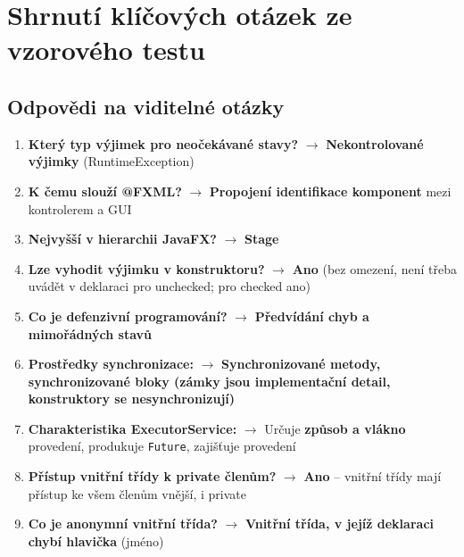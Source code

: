 \documentclass[11pt,a4paper]{article}
\begin{document}
\section{Shrnutí klíčových otázek ze vzorového testu}

\subsection{Odpovědi na viditelné otázky}

\begin{enumerate}[label=\textbf{Otázka \arabic*:}]
    \item \textbf{Který typ výjimek pro neočekávané stavy?} $\rightarrow$ \textbf{Nekontrolované výjimky} (RuntimeException)
    
    \item \textbf{K čemu slouží @FXML?} $\rightarrow$ \textbf{Propojení identifikace komponent} mezi kontrolerem a GUI
    
    \item \textbf{Nejvyšší v hierarchii JavaFX?} $\rightarrow$ \textbf{Stage}
    
    \item \textbf{Lze vyhodit výjimku v konstruktoru?} $\rightarrow$ \textbf{Ano} (bez omezení, není třeba uvádět v deklaraci pro unchecked; pro checked ano)
    
    \item \textbf{Co je defenzivní programování?} $\rightarrow$ \textbf{Předvídání chyb a mimořádných stavů}
    
    \item \textbf{Prostředky synchronizace:} $\rightarrow$ \textbf{Synchronizované metody, synchronizované bloky (zámky jsou implementační detail, konstruktory se nesynchronizují)}
    
    \item \textbf{Charakteristika ExecutorService:} $\rightarrow$ Určuje \textbf{způsob a vlákno} provedení, produkuje \texttt{Future}, zajišťuje provedení
    
    \item \textbf{Přístup vnitřní třídy k private členům?} $\rightarrow$ \textbf{Ano} -- vnitřní třídy mají přístup ke všem členům vnější, i private
    
    \item \textbf{Co je anonymní vnitřní třída?} $\rightarrow$ \textbf{Vnitřní třída, v jejíž deklaraci chybí hlavička} (jméno)
    

\end{enumerate}
\end{document}
